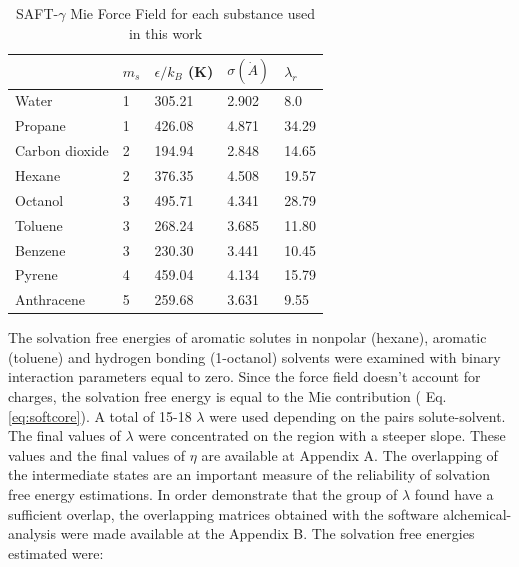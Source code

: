 \begin{table}[h]
\centering
  \caption{SAFT-$\gamma$ Mie Force Field for each substance used in this work}
  \label{tbl:parameters}
  \begin{tabular}{lllll}
  	\hline
  	               & $m_s$ & $\epsilon/k_{B}$ (K) & $\sigma (\dot{A})$ & $\lambda_r$ \\ \hline
  	Water          & 1     & 305.21               & 2.902              & 8.0         \\
  	Propane        & 1     & 426.08               & 4.871              & 34.29       \\
  	Carbon dioxide & 2     & 194.94               & 2.848              & 14.65       \\
  	Hexane         & 2     & 376.35               & 4.508              & 19.57       \\
  	Octanol        & 3     & 495.71               & 4.341              & 28.79       \\
  	Toluene        & 3     & 268.24               & 3.685              & 11.80       \\
  	Benzene        & 3     & 230.30               & 3.441              & 10.45       \\
  	Pyrene         & 4     & 459.04               & 4.134              & 15.79       \\
  	Anthracene     & 5     & 259.68               & 3.631              & 9.55        \\ \hline
  \end{tabular}

\end{table}

The solvation free energies of aromatic solutes in nonpolar (hexane), aromatic (toluene) and hydrogen bonding (1-octanol) solvents were examined with binary interaction parameters equal to zero. Since the force field doesn't account for charges, the solvation free energy is equal to the Mie contribution ( Eq. \eqref{eq:softcore}). A total of 15-18 $\lambda$ were used depending on the pairs solute-solvent. The final values of $\lambda$ were concentrated on the region with a steeper slope. These values and the final values of $\eta$ are available at  Appendix A. The overlapping of the intermediate states are an important measure of the reliability of solvation free energy estimations. In order demonstrate that the group of $\lambda$ found have a sufficient overlap, the overlapping matrices obtained with the software alchemical-analysis were made available at the Appendix B. The solvation free energies estimated  were:

